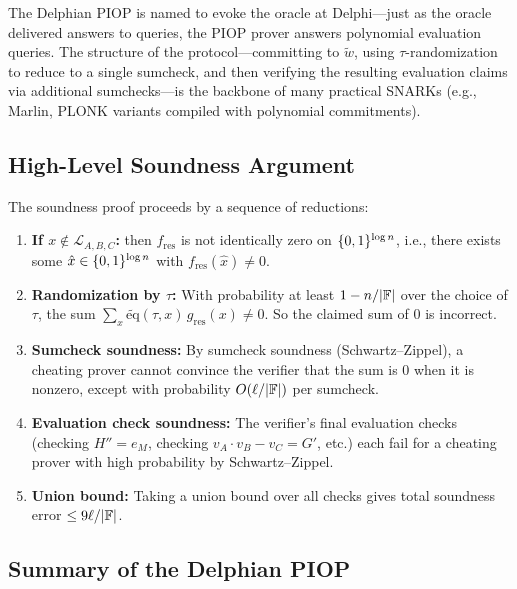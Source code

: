 \documentclass[11pt]{article}
\begin{document}
\begin{remark}
  The Delphian PIOP is named to evoke the oracle at Delphi---just as the oracle
  delivered answers to queries, the PIOP prover answers polynomial evaluation
  queries. The structure of the protocol---committing to $\tilde{w}$, using
  $\tau$-randomization to reduce to a single sumcheck, and then verifying the
  resulting evaluation claims via additional sumchecks---is the backbone of many
  practical SNARKs (e.g., Marlin, PLONK variants compiled with polynomial
  commitments).
\end{remark}

\subsection{High-Level Soundness Argument}

The soundness proof proceeds by a sequence of reductions:

\begin{enumerate}
  \item \textbf{If $x \notin \mathcal{L}_{A,B,C}$:} then $f_{\mathrm{res}}$
    is not identically zero on $\{0,1\}^{\log n}$, i.e., there exists some
    $\hat{x} \in \{0,1\}^{\log n}$ with $f_{\mathrm{res}}(\hat{x}) \neq 0$.

  \item \textbf{Randomization by $\tau$:} With probability at least
    $1 - n/|\mathbb{F}|$ over the choice of $\tau$, the sum
    $\sum_{x} \widetilde{\mathrm{eq}}(\tau, x)\, g_{\mathrm{res}}(x) \neq 0$.
    So the claimed sum of 0 is incorrect.

  \item \textbf{Sumcheck soundness:} By sumcheck soundness (Schwartz--Zippel),
    a cheating prover cannot convince the verifier that the sum is 0 when it
    is nonzero, except with probability $O(\ell/|\mathbb{F}|)$ per sumcheck.

  \item \textbf{Evaluation check soundness:} The verifier's final evaluation
    checks (checking $H'' = e_M$, checking $v_A \cdot v_B - v_C = G'$, etc.)
    each fail for a cheating prover with high probability by Schwartz--Zippel.

  \item \textbf{Union bound:} Taking a union bound over all checks gives total
    soundness error $\leq 9\ell / |\mathbb{F}|$.
\end{enumerate}

\subsection{Summary of the Delphian PIOP}
\end{document}
